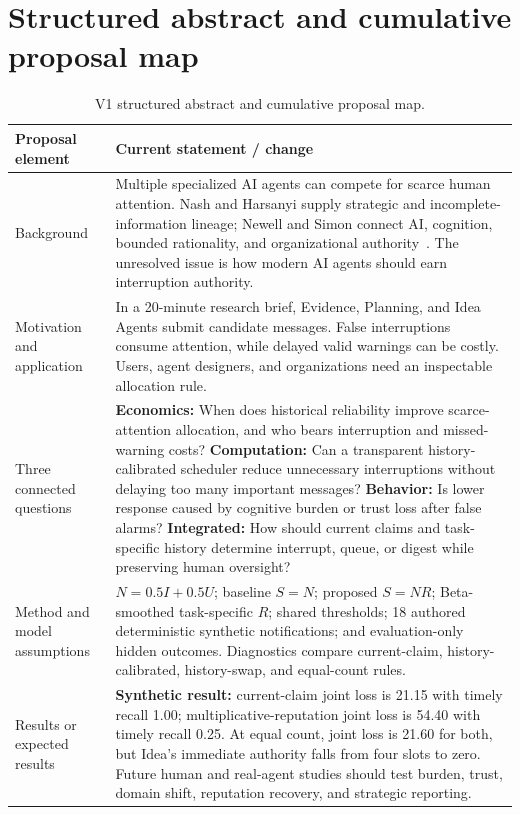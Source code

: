 \section{Structured abstract and cumulative proposal map}\label{app:abstract}
\begin{table}[H]
\caption{V1 structured abstract and cumulative proposal map.}
\label{tab:abstract-map}
\small
\renewcommand{\arraystretch}{1.10}
\begin{tabularx}{\textwidth}{@{}p{}Y@{}}
\toprule
\textbf{Proposal element} & \textbf{Current statement / change} \\
\midrule
Background & Multiple specialized AI agents can compete for scarce human attention. Nash and Harsanyi supply strategic and incomplete-information lineage; Newell and Simon connect AI, cognition, bounded rationality, and organizational authority~\cite{nash1950,harsanyi1968,nobel1994game,acm1975newellsimon,simon1978lecture}. The unresolved issue is how modern AI agents should earn interruption authority. \\
Motivation and application & In a 20-minute research brief, Evidence, Planning, and Idea Agents submit candidate messages. False interruptions consume attention, while delayed valid warnings can be costly. Users, agent designers, and organizations need an inspectable allocation rule. \\
Three connected questions & \textbf{Economics:} When does historical reliability improve scarce-attention allocation, and who bears interruption and missed-warning costs? \textbf{Computation:} Can a transparent history-calibrated scheduler reduce unnecessary interruptions without delaying too many important messages? \textbf{Behavior:} Is lower response caused by cognitive burden or trust loss after false alarms? \textbf{Integrated:} How should current claims and task-specific history determine interrupt, queue, or digest while preserving human oversight? \\
Method and model assumptions & $N=0.5I+0.5U$; baseline $S=N$; proposed $S=NR$; Beta-smoothed task-specific $R$; shared thresholds; 18 authored deterministic synthetic notifications; and evaluation-only hidden outcomes. Diagnostics compare current-claim, history-calibrated, history-swap, and equal-count rules. \\
Results or expected results & \textbf{Synthetic result:} current-claim joint loss is 21.15 with timely recall 1.00; multiplicative-reputation joint loss is 54.40 with timely recall 0.25. At equal count, joint loss is 21.60 for both, but Idea's immediate authority falls from four slots to zero. Future human and real-agent studies should test burden, trust, domain shift, reputation recovery, and strategic reporting. \\

\end{tabularx}
\end{table}
